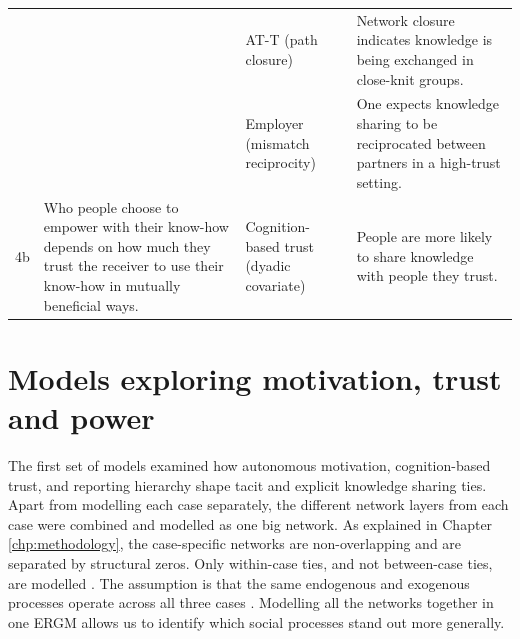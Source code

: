 \begin{table}
{\begin{tabular}{p{0.5cm} p{6cm} p{6cm} p{8cm}}
& & AT-T (path closure) & Network closure indicates knowledge is being exchanged in close-knit groups. \\
& & Employer (mismatch reciprocity) & One expects knowledge sharing to be reciprocated between partners in a high-trust setting. \\ \midrule
4b & Who people choose to empower with their know-how depends on how much they trust the receiver to use their know-how in mutually beneficial ways. & Cognition-based trust (dyadic covariate) & People are more likely to share knowledge with people they trust. \\ \bottomrule
\end{tabular}%
}
\end{table}

\section{Models exploring motivation, trust and power}

The first set of models examined how autonomous motivation, cognition-based trust, and reporting hierarchy shape tacit and explicit knowledge sharing ties. Apart from modelling each case separately, the different network layers from each case were combined and modelled as one big network. As explained in Chapter \ref{chp:methodology}, the case-specific networks are non-overlapping and are separated by structural zeros. Only within-case ties, and not between-case ties, are modelled \citep{lusher2012trust}. The assumption is that the same endogenous and exogenous processes operate across all three cases \citep{kalish2013brain}. Modelling all the networks together in one ERGM allows us to identify which social processes stand out more generally. \medskip

